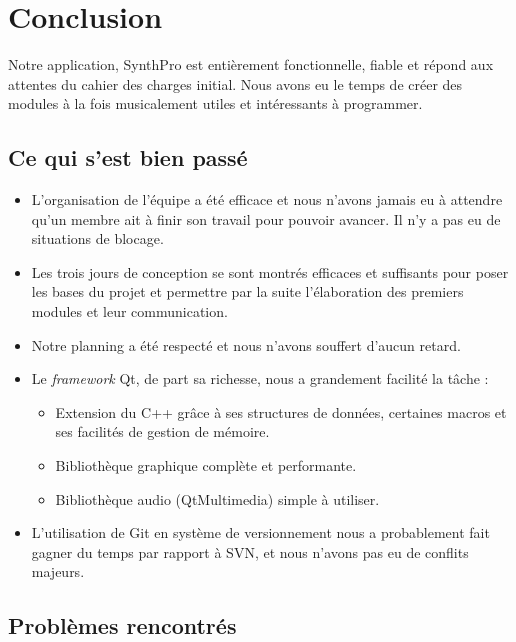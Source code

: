\section{Conclusion}

Notre application, SynthPro est entièrement fonctionnelle, fiable
et répond aux attentes du cahier des charges initial. Nous avons eu
le temps de créer des modules à la fois musicalement utiles et
intéressants à programmer.

\subsection{Ce qui s'est bien passé}

\begin{itemize}
\item
  L'organisation de l'équipe a été efficace et nous n'avons jamais eu
  à attendre qu'un membre ait à finir son travail pour pouvoir
  avancer. Il n'y a pas eu de situations de blocage.
\item
  Les trois jours de conception se sont montrés efficaces et
  suffisants pour poser les bases du projet et permettre par la suite
  l'élaboration des premiers modules et leur communication.
\item
  Notre planning a été respecté et nous n'avons souffert d'aucun
  retard.
\item
  Le \emph{framework} Qt, de part sa richesse, nous a grandement
  facilité la tâche :
  \begin{itemize}
  \item
    Extension du C++ grâce à ses structures de données, certaines
    macros et ses facilités de gestion de mémoire.
  \item
    Bibliothèque graphique complète et performante.
  \item
    Bibliothèque audio (QtMultimedia) simple à utiliser.
  \end{itemize}
\item
  L'utilisation de Git en système de versionnement nous a
  probablement fait gagner du temps par rapport à SVN, et nous
  n'avons pas eu de conflits majeurs.
\end{itemize}
\subsection{Problèmes rencontrés}

